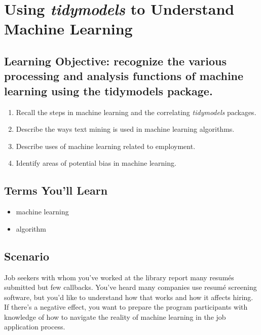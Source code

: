 \documentclass[
  krantz2]{krantz}
\providecommand{\tightlist}{%
  \setlength{\itemsep}{0pt}\setlength{\parskip}{0pt}}
\begin{document}
\hypertarget{tidymodels}{%
\chapter{\texorpdfstring{Using \emph{tidymodels} to Understand Machine Learning}{Using tidymodels to Understand Machine Learning}}\label{tidymodels}}

\hypertarget{ml-los}{%
\section{Learning Objective: recognize the various processing and analysis functions of machine learning using the tidymodels package.}\label{ml-los}}

\begin{enumerate}
\def\labelenumi{\arabic{enumi}.}
\tightlist
\item
  Recall the steps in machine learning and the correlating \emph{tidymodels} packages.
\item
  Describe the ways text mining is used in machine learning algorithms.
\item
  Describe uses of machine learning related to employment.
\item
  Identify areas of potential bias in machine learning.
\end{enumerate}

\hypertarget{ml-terms}{%
\section{Terms You'll Learn}\label{ml-terms}}

\begin{itemize}
\tightlist
\item
  machine learning
\item
  algorithm
\end{itemize}

\hypertarget{ml-scenario}{%
\section{Scenario}\label{ml-scenario}}

Job seekers with whom you've worked at the library report many resumés submitted but few callbacks. You've heard many companies use resumé screening software, but you'd like to understand how that works and how it affects hiring. If there's a negative effect, you want to prepare the program participants with knowledge of how to navigate the reality of machine learning in the job application process.
\end{document}
